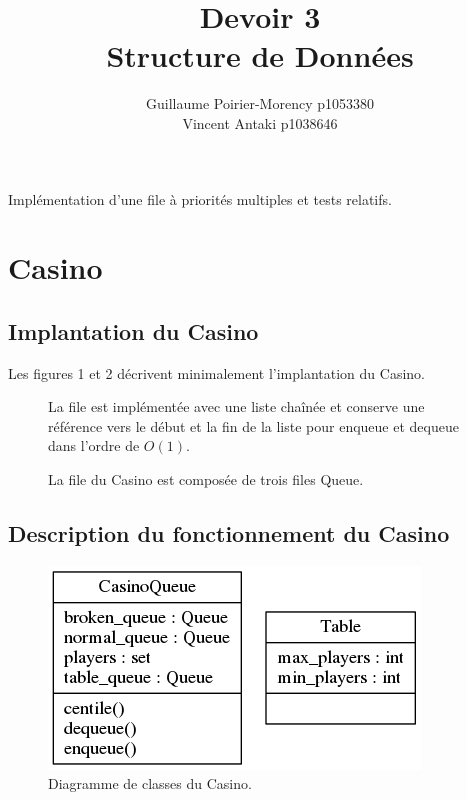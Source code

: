 \documentclass[french]{article}
\title{Devoir 3 \\Structure de Données}
\author{Guillaume Poirier-Morency p1053380 \\ Vincent Antaki p1038646}
\begin{document}
\maketitle

\abstract
Implémentation d'une file à priorités multiples et tests relatifs.

\section{Casino}

\subsection{Implantation du Casino}
Les figures 1 et 2 décrivent minimalement l'implantation du Casino.

\begin{figure}

\caption
{
  La file est implémentée avec une liste chaînée et conserve une référence vers
  le début et la fin de la liste pour \textsf{enqueue} et \textsf{dequeue} dans
  l'ordre de $O(1)$.
}
\end{figure}

\begin{figure}

\caption{La file du Casino est composée de trois files \textsf{Queue}.}
\end{figure}

\subsection{Description du fonctionnement du Casino}
\begin{figure}
  \centering
  \includegraphics[resolution=130]{figures/diagramme-casino.png}
  \caption{Diagramme de classes du Casino.}
\end{figure}
\end{document}
